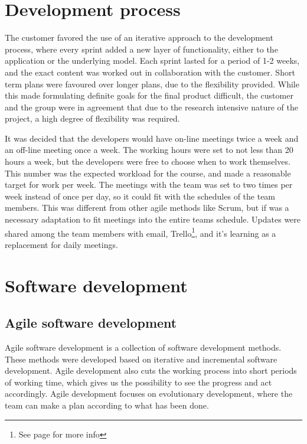 \section{Development process}
\label{def:devProcess}

The customer favored the use of an iterative approach to the development process, where every sprint added a new layer of functionality, either to the application or the underlying model. Each sprint lasted for a period of 1-2 weeks, and the exact content was worked out in collaboration with the customer. Short term plans were favoured over longer plans, due to the flexibility provided. While this made formulating definite goals for the final product difficult, the customer and the group were in agreement that due to the research intensive nature of the project, a high degree of flexibility was required. 

It was decided that the developers would have on-line meetings twice a week and an off-line meeting once a week. 
The working hours were set to not less than 20 hours a week, but the developers were free to choose when to work themselves. This number was the expected workload for the course, and made a reasonable target for work per week. The meetings with the team was set to two times per week instead of once per day, so it could fit with the schedules of the team members. This was different from other agile methods like Scrum, but if was a necessary adaptation to fit meetings into the entire teams schedule. Updates were shared among the team members with email, Trello\footnote{See page \pageref{def:trello} for more info}, and it's learning as a replacement for daily meetings.


\section{Software development}
\subsection{Agile software development}
Agile software development is a collection of software development methods. These methods were developed based on iterative and incremental software development. Agile development also cuts the working process into short periods of working time, which gives us the possibility to see the progress and act accordingly. Agile development focuses on evolutionary development, where the team can make a plan according to what has been done.  

